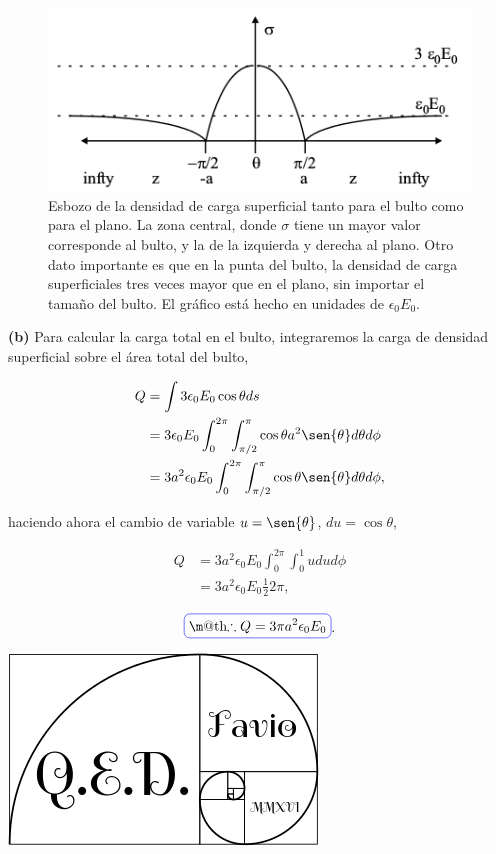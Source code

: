 \documentclass[a4paper,10pt]{article}
\makeatletter
\numberwithin{equation}{section}
\newcommand*{\boxcolor}{blue}
\renewcommand{\boxed}[1]{\textcolor{\boxcolor}{%
\tikz[baseline={([yshift=-1ex]current bounding box.center)}] \node [rectangle, minimum width=1ex,rounded corners,draw] {\normalcolor\m@th$\displaystyle#1$};}}
\makeatother
\begin{document}
\begin{figure}[H]
 \center
 \includegraphics[scale=0.8]{problema5fig1}
 \caption{Esbozo de la densidad de carga superficial tanto para el bulto como 
 para el plano. La zona central, donde $\sigma$ tiene un mayor valor corresponde 
 al bulto, y la de la izquierda y derecha al plano. Otro dato importante es que 
 en la punta del bulto, la densidad de carga superficiales tres veces mayor 
 que en el plano, sin importar el tamaño del bulto. El gráfico está hecho en 
 unidades de $\epsilon_0E_0$.}
\end{figure}

\vspace{.3cm}

\textbf{(b)} Para calcular la carga total en el bulto, integraremos la carga 
de densidad superficial sobre el área total del bulto, 

\begin{align*}
 Q &= \int 3\epsilon_0E_0\cos{\theta}ds \\
   &= 3\epsilon_0E_0 \int_0^{2\pi}\int_{\pi/2}^{\pi} \cos{\theta} a^2 
   \sen{\theta} d\theta d\phi \\
   &= 3a^2\epsilon_0E_0 \int_0^{2\pi}\int_{\pi/2}^{\pi} \cos{\theta}
   \sen{\theta} d\theta d\phi,
\end{align*}

haciendo ahora el cambio de variable $u = \sen{\theta}$, $du = \cos{\theta}$, 

\begin{align*}
 Q &= 3a^2\epsilon_0E_0\int_0^{2\pi}\int_{0}^{1} udud\phi \\
   &= 3a^2\epsilon_0E_0 \frac{1}{2}2\pi,
\end{align*}

\begin{equation}
 \boxed{\therefore Q = 3\pi a^2 \epsilon_0E_0 }.
\end{equation}

\hspace{10cm}\includegraphics[scale=0.2]{logoQED}
\end{document}
